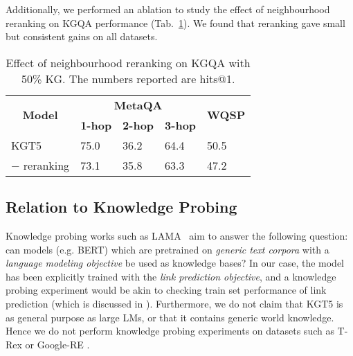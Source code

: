 \documentclass[11pt]{article}
\renewcommand\:{\colon} \newcommand{\sset}[1]{\left\{\,#1\,\right\}} \newcommand{\ssets}[1]{\left\{#1\right\}} \newcommand{\ssetn}[1]{\{\,#1\,\}}
\newcommand{\method}{\textsc{KGT5}}
\begin{document}
Additionally, we performed an ablation to study the effect of neighbourhood reranking on KGQA performance (Tab.~\ref{tab:nbhood-reranking-ablation}). We found that reranking gave small but consistent gains on all datasets.
\begin{table}[t!]
\centering
\begin{tabular}{@{}cllll@{}}
\toprule
\multirow{2}{*}{\textbf{Model}} & \multicolumn{3}{c}{\textbf{MetaQA}}                                                                          & \multicolumn{1}{c}{\multirow{2}{*}{\textbf{WQSP}}} \\
                                & \multicolumn{1}{c}{\textbf{1-hop}} & \multicolumn{1}{c}{\textbf{2-hop}} & \multicolumn{1}{c}{\textbf{3-hop}} & \multicolumn{1}{c}{}                               \\ \midrule
\multicolumn{1}{l}{\method{}}        & 75.0                                 & 36.2                               & 64.4                               & 50.5                                               \\
\multicolumn{1}{r}{$-$ reranking} & 73.1                               & 35.8                               & 63.3                               & 47.2                                               \\ \bottomrule
\end{tabular}
\caption{Effect of neighbourhood reranking on KGQA with 50\% KG. The numbers reported are hits@1.}
\label{tab:nbhood-reranking-ablation}
\end{table} 

\subsection{Relation to Knowledge Probing}
\label{sec:knowledge-probing}
Knowledge probing works such as LAMA~\cite{lama} aim to answer the following question: can models (e.g. BERT) which are pretrained on \textit{generic text corpora} with a \textit{language modeling objective} be used as knowledge bases? 
In our case, the model has been explicitly trained with the \textit{link prediction objective}, and a knowledge probing experiment would be akin to checking train set performance of link prediction (which is discussed in ).
Furthermore, we do not claim that \method{} is as general purpose as large LMs, or that it contains generic world knowledge.
Hence we do not perform knowledge probing experiments on datasets such as T-Rex or Google-RE \cite{lama}.
\end{document}
